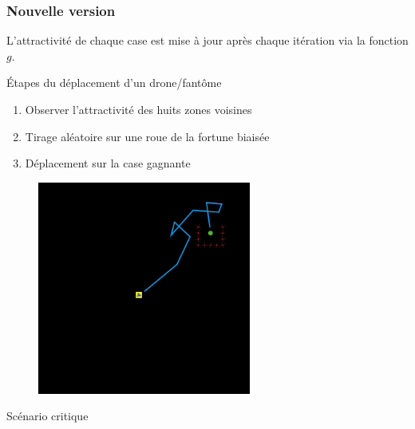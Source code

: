 \documentclass{beamer}
\begin{document}
\begin{frame}

  \frametitle{Nouvelle version}

  L'attractivité de chaque case est mise à jour après chaque itération
  via la fonction $g$.

  \vfill

  \begin{block}{\'Etapes du déplacement d'un drone/fantôme}
    \begin{enumerate}
    \item{Observer l'attractivité des huits zones voisines}
    \item{Tirage aléatoire sur une roue de la fortune biaisée}
    \item{Déplacement sur la case gagnante}
    \end{enumerate}
  \end{block}

\end{frame}

\begin{frame}

  \begin{figure}
    \centering
    \includegraphics[width=7cm]{path2.png}
  \end{figure}

  \vfill

  \begin{center}
    Scénario critique
  \end{center}

\end{frame}
\end{document}
